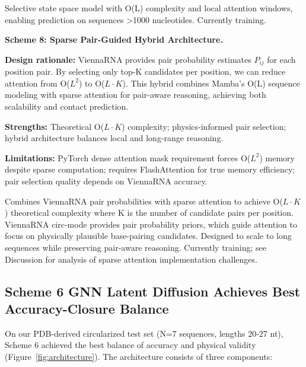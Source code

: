 \documentclass[12pt]{article}
\begin{document}
Selective state space model \citep{gu2023} with O(L) complexity and local attention windows, enabling prediction on sequences >1000 nucleotides. Currently training.

\textbf{Scheme 8: Sparse Pair-Guided Hybrid Architecture.}

\textbf{Design rationale:} ViennaRNA provides pair probability estimates $P_{ij}$ for each position pair. By selecting only top-K candidates per position, we can reduce attention from O($L^2$) to O($L \cdot K$). This hybrid combines Mamba's O(L) sequence modeling with sparse attention for pair-aware reasoning, achieving both scalability and contact prediction.

\textbf{Strengths:} Theoretical O($L \cdot K$) complexity; physics-informed pair selection; hybrid architecture balances local and long-range reasoning.

\textbf{Limitations:} PyTorch dense attention mask requirement forces O($L^2$) memory despite sparse computation; requires FlashAttention for true memory efficiency; pair selection quality depends on ViennaRNA accuracy.

Combines ViennaRNA pair probabilities with sparse attention to achieve O($L \cdot K$) theoretical complexity where K is the number of candidate pairs per position. ViennaRNA circ-mode provides pair probability priors, which guide attention to focus on physically plausible base-pairing candidates. Designed to scale to long sequences while preserving pair-aware reasoning. Currently training; see Discussion for analysis of sparse attention implementation challenges.

\subsection{Scheme 6 GNN Latent Diffusion Achieves Best Accuracy-Closure Balance}

On our PDB-derived circularized test set (N=7 sequences, lengths 20-27 nt), Scheme 6 achieved the best balance of accuracy and physical validity (Figure~\ref{fig:architecture}). The architecture consists of three components:
\end{document}

